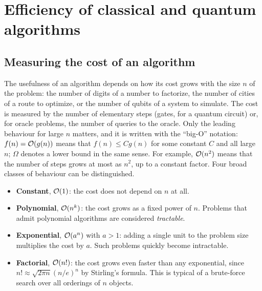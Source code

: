 \chapter{Efficiency of classical and quantum algorithms}\label{ch:complexity}

\section{Measuring the cost of an algorithm}
The usefulness of an algorithm depends on how its cost grows with the size $n$ of the problem: the number of digits of a number to factorize, the number of cities of a route to optimize, or the number
of qubits of a system to simulate. The cost is measured by the number of elementary steps (gates, for a quantum circuit) or, for oracle problems, the number of queries to the oracle. Only the leading behaviour
for large $n$ matters, and it is written with the ``big-O'' notation: $f(n)=\mathcal O(g(n))$ means that $f(n)\le Cg(n)$ for some constant $C$ and all large $n$; $\Omega$ denotes a lower bound in the same sense.
For example, $\mathcal O(n^2)$ means that the number of steps grows at most as $n^2$, up to a constant factor. Four broad classes of behaviour can be distinguished.
\begin{itemize}
  \item \textbf{Constant}, $\mathcal O(1)$: the cost does not depend on $n$ at all.
  \item \textbf{Polynomial}, $\mathcal O(n^k)$: the cost grows as a fixed power of $n$. Problems that admit polynomial algorithms are considered \emph{tractable}.
  \item \textbf{Exponential}, $\mathcal O(a^n)$ with $a>1$: adding a single unit to the problem size multiplies the cost by $a$. Such problems quickly become intractable.
  \item \textbf{Factorial}, $\mathcal O(n!)$: the cost grows even faster than any exponential, since $n!\approx\sqrt{2\pi n}(n/e)^n$ by Stirling's formula. This is typical of a brute-force search over all orderings of $n$ objects.
\end{itemize}

